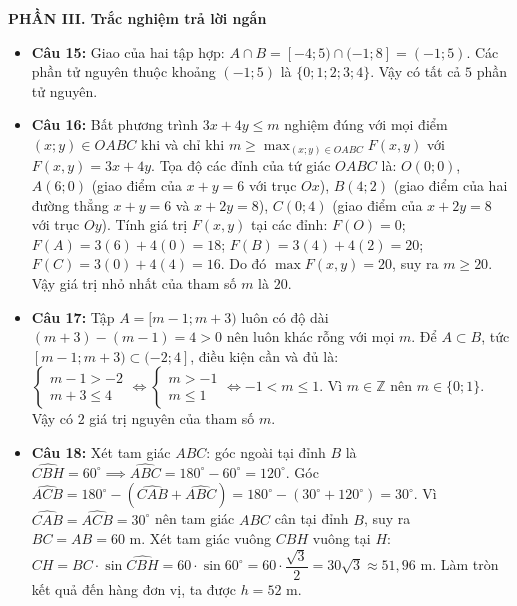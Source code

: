 \documentclass[12pt,a4paper]{article}
\begin{document}
\vspace{0.1cm}
\textbf{PHẦN III. Trắc nghiệm trả lời ngắn}
\begin{itemize}[leftmargin=0.6cm, itemsep=1.5pt, topsep=1pt]
    \item \textbf{Câu 15:} Giao của hai tập hợp: $A \cap B = [-4; 5) \cap (-1; 8] = (-1; 5)$.
    Các phần tử nguyên thuộc khoảng $(-1; 5)$ là $\{0; 1; 2; 3; 4\}$. Vậy có tất cả $5$ phần tử nguyên.
    \item \textbf{Câu 16:} Bất phương trình $3x + 4y \le m$ nghiệm đúng với mọi điểm $(x; y) \in OABC$ khi và chỉ khi $m \ge \max_{(x; y) \in OABC} F(x, y)$ với $F(x, y) = 3x + 4y$.
    Tọa độ các đỉnh của tứ giác $OABC$ là: $O(0; 0)$, $A(6; 0)$ (giao điểm của $x + y = 6$ với trục $Ox$), $B(4; 2)$ (giao điểm của hai đường thẳng $x + y = 6$ và $x + 2y = 8$), $C(0; 4)$ (giao điểm của $x + 2y = 8$ với trục $Oy$).
    Tính giá trị $F(x, y)$ tại các đỉnh:
    $F(O) = 0$; $F(A) = 3(6) + 4(0) = 18$; $F(B) = 3(4) + 4(2) = 20$; $F(C) = 3(0) + 4(4) = 16$.
    Do đó $\max F(x, y) = 20$, suy ra $m \ge 20$. Vậy giá trị nhỏ nhất của tham số $m$ là $20$.
    \item \textbf{Câu 17:} Tập $A = [m - 1; m + 3)$ luôn có độ dài $(m + 3) - (m - 1) = 4 > 0$ nên luôn khác rỗng với mọi $m$.
    Để $A \subset B$, tức $[m - 1; m + 3) \subset (-2; 4]$, điều kiện cần và đủ là:
    $\begin{cases} m - 1 > -2 \\ m + 3 \le 4 \end{cases} \iff \begin{cases} m > -1 \\ m \le 1 \end{cases} \iff -1 < m \le 1$.
    Vì $m \in \mathbb{Z}$ nên $m \in \{0; 1\}$. Vậy có $2$ giá trị nguyên của tham số $m$.
    \item \textbf{Câu 18:} Xét tam giác $ABC$: góc ngoài tại đỉnh $B$ là $\widehat{CBH} = 60^\circ \implies \widehat{ABC} = 180^\circ - 60^\circ = 120^\circ$.
    Góc $\widehat{ACB} = 180^\circ - (\widehat{CAB} + \widehat{ABC}) = 180^\circ - (30^\circ + 120^\circ) = 30^\circ$.
    Vì $\widehat{CAB} = \widehat{ACB} = 30^\circ$ nên tam giác $ABC$ cân tại đỉnh $B$, suy ra $BC = AB = 60\text{ m}$.
    Xét tam giác vuông $CBH$ vuông tại $H$:
    $CH = BC \cdot \sin \widehat{CBH} = 60 \cdot \sin 60^\circ = 60 \cdot \dfrac{\sqrt{3}}{2} = 30\sqrt{3} \approx 51{,}96\text{ m}$.
    Làm tròn kết quả đến hàng đơn vị, ta được $h = 52\text{ m}$.
\end{itemize}
\end{document}
